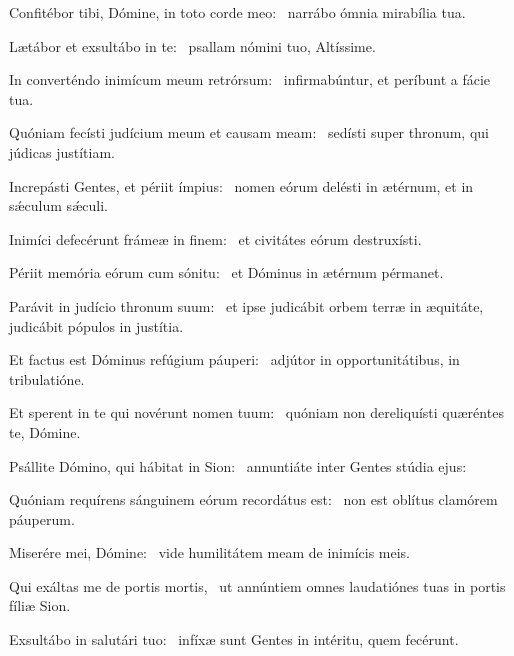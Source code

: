\item Confitébor tibi, Dómine, in toto corde meo:~\psstar{} narrábo ómnia mirabília tua.

\item Lætábor et exsultábo in te:~\psstar{} psallam nómini tuo, Altíssime.

\item In converténdo inimícum meum retrórsum:~\psstar{} infirmabúntur, et períbunt a fácie tua.

\item Quóniam fecísti judícium meum et causam meam:~\psstar{} sedísti super thronum, qui júdicas justítiam.

\item Increpásti Gentes, et périit ímpius:~\psstar{} nomen eórum delésti in ætérnum, et in sǽculum sǽculi.

\item Inimíci defecérunt frámeæ in finem:~\psstar{} et civitátes eórum destruxísti.

\item Périit memória eórum cum sónitu:~\psstar{} et Dóminus in ætérnum pérmanet.

\item Parávit in judício thronum suum:~\psstar{} et ipse judicábit orbem terræ in æquitáte, judicábit pópulos in justítia.

\item Et factus est Dóminus refúgium páuperi:~\psstar{} adjútor in opportunitátibus, in tribulatióne.

\item Et sperent in te qui novérunt nomen tuum:~\psstar{} quóniam non dereliquísti quæréntes te, Dómine.

\item Psállite Dómino, qui hábitat in Sion:~\psstar{} annuntiáte inter Gentes stúdia ejus:

\item Quóniam requírens sánguinem eórum recordátus est:~\psstar{} non est oblítus clamórem páuperum.

\item Miserére mei, Dómine:~\psstar{} vide humilitátem meam de inimícis meis.

\item Qui exáltas me de portis mortis,~\psstar{} ut annúntiem omnes laudatiónes tuas in portis fíliæ Sion.

\item Exsultábo in salutári tuo:~\psstar{} infíxæ sunt Gentes in intéritu, quem fecérunt.


